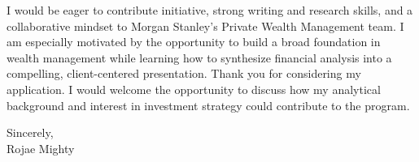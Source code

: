 \documentclass[10pt,letterpaper]{article}
\begin{document}
I would be eager to contribute initiative, strong writing and research skills, and a collaborative mindset to Morgan Stanley's Private Wealth Management team. I am especially motivated by the opportunity to build a broad foundation in wealth management while learning how to synthesize financial analysis into a compelling, client-centered presentation. Thank you for considering my application. I would welcome the opportunity to discuss how my analytical background and interest in investment strategy could contribute to the program.

\vspace{4pt}
Sincerely,\\[12pt]
Rojae Mighty
\end{document}

